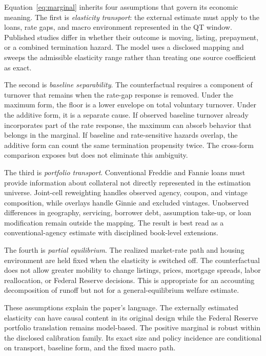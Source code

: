 Equation~\eqref{eq:marginal} inherits four assumptions that govern its economic meaning. The first is \emph{elasticity transport}: the external estimate must apply to the loans, rate gaps, and macro environment represented in the QT window. Published studies differ in whether their outcome is moving, listing, prepayment, or a combined termination hazard. The model uses a disclosed mapping and sweeps the admissible elasticity range rather than treating one source coefficient as exact.

The second is \emph{baseline separability}. The counterfactual requires a component of turnover that remains when the rate-gap response is removed. Under the maximum form, the floor is a lower envelope on total voluntary turnover. Under the additive form, it is a separate cause. If observed baseline turnover already incorporates part of the rate response, the maximum can absorb behavior that belongs in the marginal. If baseline and rate-sensitive hazards overlap, the additive form can count the same termination propensity twice. The cross-form comparison exposes but does not eliminate this ambiguity.

The third is \emph{portfolio transport}. Conventional Freddie and Fannie loans must provide information about collateral not directly represented in the estimation universe. Joint-cell reweighting handles observed agency, coupon, and vintage composition, while overlays handle Ginnie and excluded vintages. Unobserved differences in geography, servicing, borrower debt, assumption take-up, or loan modification remain outside the mapping. The result is best read as a conventional-agency estimate with disciplined book-level extensions.

The fourth is \emph{partial equilibrium}. The realized market-rate path and housing environment are held fixed when the elasticity is switched off. The counterfactual does not allow greater mobility to change listings, prices, mortgage spreads, labor reallocation, or Federal Reserve decisions. This is appropriate for an accounting decomposition of runoff but not for a general-equilibrium welfare estimate.

These assumptions explain the paper's language. The externally estimated elasticity can have causal content in its original design while the Federal Reserve portfolio translation remains model-based. The positive marginal is robust within the disclosed calibration family. Its exact size and policy incidence are conditional on transport, baseline form, and the fixed macro path.

